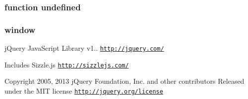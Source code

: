 \hypertarget{jquery-1_810_82_8js_a08113a236cc18d2a9d5ce27e638012be}{
\subsubsection[{undefined}]{\setlength{\rightskip}{0pt plus 5cm}function undefined}}\label{jquery-1_810_82_8js_a08113a236cc18d2a9d5ce27e638012be}
\hypertarget{jquery-1_810_82_8js_a04a8a2bbfa9c15500892b8e5033d625b}{
\subsubsection[{window}]{\setlength{\rightskip}{0pt plus 5cm}window}}\label{jquery-1_810_82_8js_a04a8a2bbfa9c15500892b8e5033d625b}
j\-Query Java\-Script Library v1.. \href{http://jquery.com/}{\tt http\-://jquery.\-com/}

Includes Sizzle.\-js \href{http://sizzlejs.com/}{\tt http\-://sizzlejs.\-com/}

Copyright 2005, 2013 j\-Query Foundation, Inc. and other contributors Released under the M\-I\-T license \href{http://jquery.org/license}{\tt http\-://jquery.\-org/license}

